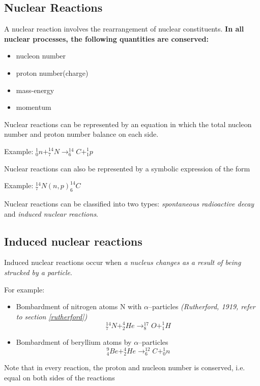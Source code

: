 \subsection{Nuclear Reactions}
A nuclear reaction involves the rearrangement of nuclear constituents. \textbf{In all nuclear processes, the following quantities are conserved:}
\begin{itemize}
\item nucleon number
\item proton number(charge)
\item mass-energy
\item momentum
\end{itemize}

Nuclear reactions can be represented by an equation in which the total nucleon number and proton number balance on each side.

Example: \quad \quad $^1_0n + ^{14}_7N \rightarrow ^{14}_6 C +^1_1 p$

Nuclear reactions can also be represented by a symbolic expression of the form

Example: \quad \quad $^{14}_7 N (n,p) ^{14}_6 C$

Nuclear reactions can be classified into two types: \emph{spontaneous radioactive decay} and \emph{induced nuclear reactions}.

\subsection{Induced nuclear reactions}
Induced nuclear reactions occur when \emph{a nucleus changes as a result of being strucked by a particle}.

For example:
\begin{itemize}
\item Bombardment of nitrogen atoms N with $\alpha$--particles \emph{(Rutherford, 1919, refer to section \ref{rutherford})}
$$^{14}_7N + ^4_2He \rightarrow ^{17}_8 O + ^1_1H$$
\item Bombardment of beryllium atoms by $\alpha$--particles
$$_4^9Be + _2^4He \rightarrow _6^{12} C + _0^1 n$$
\end{itemize}

Note that in every reaction, the proton and nucleon number is conserved, i.e. equal on both sides of the reactions


